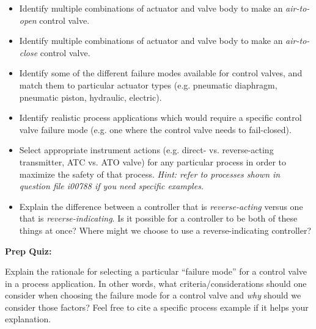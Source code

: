 \begin{itemize}
\item{} Identify multiple combinations of actuator and valve body to make an {\it air-to-open} control valve.
\item{} Identify multiple combinations of actuator and valve body to make an {\it air-to-close} control valve.
\item{} Identify some of the different failure modes available for control valves, and match them to particular actuator types (e.g. pneumatic diaphragm, pneumatic piston, hydraulic, electric).
\item{} Identify realistic process applications which would require a specific control valve failure mode (e.g. one where the control valve needs to fail-closed).
\item{} Select appropriate instrument actions (e.g. direct- vs. reverse-acting transmitter, ATC vs. ATO valve) for any particular process in order to maximize the safety of that process.  {\it Hint: refer to processes shown in question file i00788 if you need specific examples.}
\item{} Explain the difference between a controller that is {\it reverse-acting} versus one that is {\it reverse-indicating}.  Is it possible for a controller to be both of these things at once?  Where might we choose to use a reverse-indicating controller?
\end{itemize}









\vfil \eject

\noindent
{\bf Prep Quiz:}

Explain the rationale for selecting a particular ``failure mode'' for a control valve in a process application.  In other words, what criteria/considerations should one consider when choosing the failure mode for a control valve and {\it why} should we consider those factors?  Feel free to cite a specific process example if it helps your explanation.





